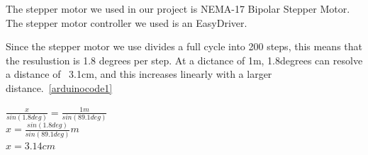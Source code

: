 The stepper motor we used in our project is NEMA-17 Bipolar Stepper Motor. \cite{steppermotor}
The stepper motor controller we used is an EasyDriver.\cite{steppercontroller}



Since the stepper motor we use divides a full cycle into 200 steps, this means that the resulustion is 1.8 degrees per step. At a dictance of 1m, 1.8degrees can resolve a distance of ~3.1cm, and this increases linearly with a larger distance.~\ref{arduinocode1}

$\frac{x}{sin(1.8deg)} = \frac{1m}{sin(89.1deg)}$ \\
$x = \frac{sin(1.8deg)}{sin(89.1deg)}m$ \\
$x = 3.14cm$ \\


